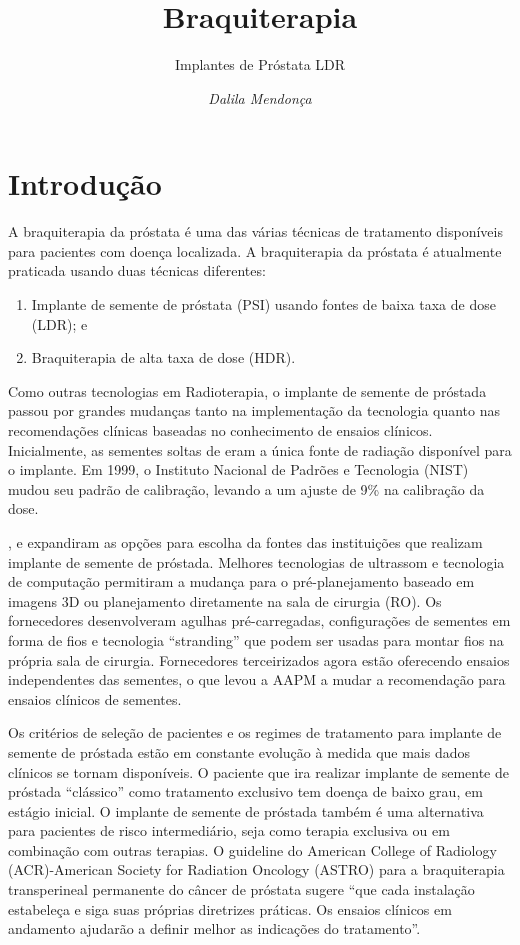 \documentclass[11pt,a4paper]{article}
\title{\LobsterTwo\Huge{Braquiterapia}}
\author{\LobsterTwo\Large{Implantes de Próstata LDR}\nocite{*}}
\date{\LobsterTwo\textit{Dalila Mendonça}}
\begin{document}
	\maketitle

\section{Introdução}

	A braquiterapia da próstata é uma das várias técnicas de tratamento disponíveis para pacientes com doença localizada. A braquiterapia da próstata é atualmente praticada usando duas técnicas diferentes:

	\begin{enumerate}[label=\textcolor{CarnationPink}{\roman*.}]
		\item Implante de semente de próstata (PSI) usando fontes de baixa taxa de dose (LDR); e
		\item Braquiterapia de alta taxa de dose (HDR).
	\end{enumerate}

	Como outras tecnologias em Radioterapia, o implante de semente de próstada passou por grandes mudanças tanto na implementação da tecnologia quanto nas recomendações clínicas baseadas no conhecimento de ensaios clínicos. Inicialmente, as sementes soltas de  eram a única fonte de radiação disponível para o implante. Em 1999, o Instituto Nacional de Padrões e Tecnologia (NIST) mudou seu padrão de calibração, levando a um ajuste de 9\% na calibração da dose. 
	
	,  e  expandiram as opções para escolha da fontes das instituições que realizam implante de semente de próstada. Melhores tecnologias de ultrassom e tecnologia de computação permitiram a mudança para o pré-planejamento baseado em imagens 3D ou planejamento diretamente na sala de cirurgia (RO). Os fornecedores desenvolveram agulhas pré-carregadas, configurações de sementes em forma de fios e tecnologia  ``stranding'' que podem ser usadas para montar fios na própria sala de cirurgia. Fornecedores terceirizados agora estão oferecendo ensaios independentes das sementes, o que levou a AAPM a mudar a recomendação para ensaios clínicos de sementes.

	Os critérios de seleção de pacientes e os regimes de tratamento para implante de semente de próstada estão em constante evolução à medida que mais dados clínicos se tornam disponíveis. O paciente que ira realizar implante de semente de próstada ``clássico'' como tratamento exclusivo tem doença de baixo grau, em estágio inicial. O implante de semente de próstada também é uma alternativa para pacientes de risco intermediário, seja como terapia exclusiva ou em combinação com outras terapias. O guideline do American College of Radiology (ACR)-American Society for Radiation Oncology (ASTRO) para a braquiterapia transperineal permanente do câncer de próstata sugere “que cada instalação estabeleça e siga suas próprias diretrizes práticas. Os ensaios clínicos em andamento ajudarão a definir melhor as indicações do tratamento”. 
\end{document}
